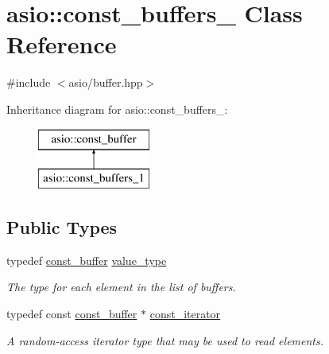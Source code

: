 \hypertarget{classasio_1_1const__buffers__1}{}\section{asio\+:\+:const\+\_\+buffers\+\_ Class Reference}
\label{classasio_1_1const__buffers__1}


{\ttfamily \#include $<$asio/buffer.\+hpp$>$}

Inheritance diagram for asio\+:\+:const\+\_\+buffers\+\_\+:\begin{figure}[H]
\begin{center}
\leavevmode
\includegraphics[height=2.000000cm]{classasio_1_1const__buffers__1}
\end{center}
\end{figure}
\subsection*{Public Types}
\begin{DoxyCompactItemize}
\item 
typedef \hyperlink{classasio_1_1const__buffer}{const\+\_\+buffer} \hyperlink{classasio_1_1const__buffers__1_a6ff152a78d4d0e448b3b98e26dc22fc2}{value\+\_\+type}
\begin{DoxyCompactList}\small\item\em The type for each element in the list of buffers. \end{DoxyCompactList}\item 
typedef const \hyperlink{classasio_1_1const__buffer}{const\+\_\+buffer} $\ast$ \hyperlink{classasio_1_1const__buffers__1_af82877a0ca877a65af2e4c0990c854b4}{const\+\_\+iterator}
\begin{DoxyCompactList}\small\item\em A random-\/access iterator type that may be used to read elements. \end{DoxyCompactList}\end{DoxyCompactItemize}
